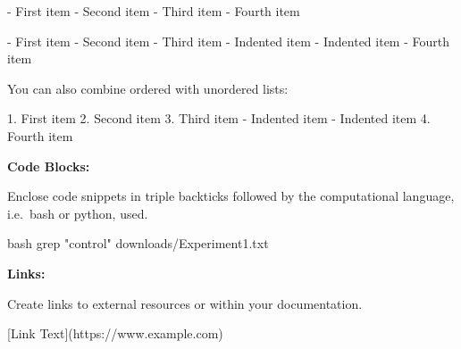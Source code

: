 \documentclass[
  letterpaper,
  DIV=11,
  numbers=noendperiod]{scrreprt}
\newenvironment{Shaded}{}{}
\newcommand{\CommentTok}[1]{\textcolor[rgb]{0.42,0.45,0.49}{#1}}
\newcommand{\FunctionTok}[1]{\textcolor[rgb]{0.44,0.26,0.76}{#1}}
\newcommand{\InformationTok}[1]{\textcolor[rgb]{0.42,0.45,0.49}{#1}}
\newcommand{\NormalTok}[1]{\textcolor[rgb]{0.14,0.16,0.18}{#1}}
\newcommand{\OtherTok}[1]{\textcolor[rgb]{0.44,0.26,0.76}{#1}}
\newcommand{\SpecialStringTok}[1]{\textcolor[rgb]{0.01,0.18,0.38}{#1}}
\newcommand{\StringTok}[1]{\textcolor[rgb]{0.01,0.18,0.38}{#1}}
\begin{document}
\begin{Shaded}
\begin{Highlighting}[]
\SpecialStringTok{{-} }\NormalTok{First item}
\SpecialStringTok{{-} }\NormalTok{Second item}
\SpecialStringTok{{-} }\NormalTok{Third item}
\SpecialStringTok{{-} }\NormalTok{Fourth item }
\end{Highlighting}
\end{Shaded}

\begin{Shaded}
\begin{Highlighting}[]
\SpecialStringTok{ {-} }\NormalTok{First item}
\SpecialStringTok{{-} }\NormalTok{Second item}
\SpecialStringTok{{-} }\NormalTok{Third item}
\SpecialStringTok{    {-} }\NormalTok{Indented item}
\SpecialStringTok{    {-} }\NormalTok{Indented item}
\SpecialStringTok{{-} }\NormalTok{Fourth item }
\end{Highlighting}
\end{Shaded}

You can also combine ordered with unordered lists:

\begin{Shaded}
\begin{Highlighting}[]
\SpecialStringTok{1. }\NormalTok{First item}
\SpecialStringTok{2. }\NormalTok{Second item}
\SpecialStringTok{3. }\NormalTok{Third item}
\SpecialStringTok{    {-} }\NormalTok{Indented item}
\SpecialStringTok{    {-} }\NormalTok{Indented item}
\SpecialStringTok{4. }\NormalTok{Fourth item}
\end{Highlighting}
\end{Shaded}

\textbf{Code Blocks:}

Enclose code snippets in triple backticks followed by the computational
language, i.e.~bash or python, used.

\begin{Shaded}
\begin{Highlighting}[]
\InformationTok{\textasciigrave{}\textasciigrave{}\textasciigrave{}bash}
\FunctionTok{grep} \StringTok{"control"}\NormalTok{ downloads/Experiment1.txt}
\InformationTok{\textasciigrave{}\textasciigrave{}\textasciigrave{}}
\end{Highlighting}
\end{Shaded}

\textbf{Links:}

Create links to external resources or within your documentation.

\begin{Shaded}
\begin{Highlighting}[]
\CommentTok{[}\OtherTok{Link Text}\CommentTok{](https://www.example.com)}
\end{Highlighting}
\end{Shaded}
\end{document}
